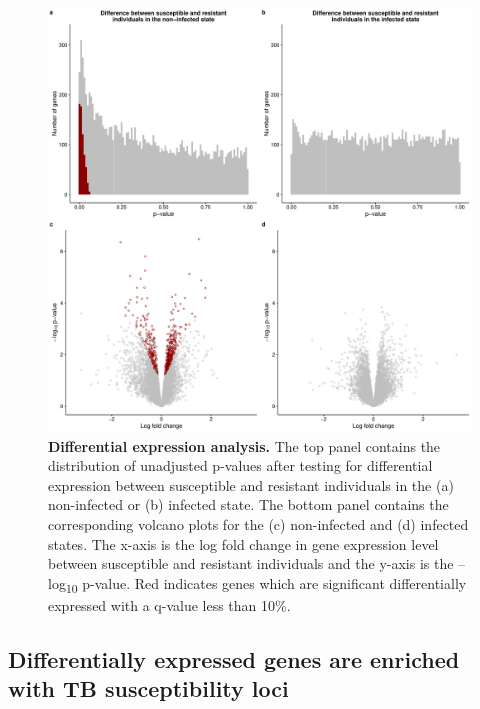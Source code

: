 \begin{figure}
\centering \includegraphics[width=5in]{img/ch03/limma.pdf}
\caption[Differential expression analysis.]{ \textbf{Differential
    expression analysis.} The top panel contains the distribution of
  unadjusted p-values after testing for differential expression
  between susceptible and resistant individuals in the (a)
  non-infected or (b) infected state. The bottom panel contains the
  corresponding volcano plots for the (c) non-infected and (d)
  infected states. The x-axis is the log fold change in gene
  expression level between susceptible and resistant individuals and
  the y-axis is the –log\textsubscript{10} p-value. Red indicates
  genes which are significant differentially expressed with a q-value
  less than 10\%.  }
\label{fig:limma}
\end{figure}
\subsection{Differentially expressed genes are enriched with TB susceptibility loci}


